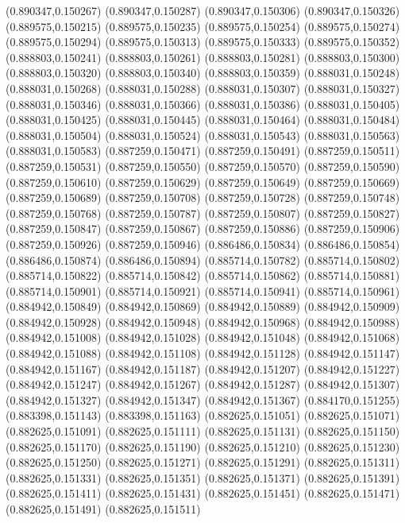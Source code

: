 (0.890347,0.150267)
(0.890347,0.150287)
(0.890347,0.150306)
(0.890347,0.150326)
(0.889575,0.150215)
(0.889575,0.150235)
(0.889575,0.150254)
(0.889575,0.150274)
(0.889575,0.150294)
(0.889575,0.150313)
(0.889575,0.150333)
(0.889575,0.150352)
(0.888803,0.150241)
(0.888803,0.150261)
(0.888803,0.150281)
(0.888803,0.150300)
(0.888803,0.150320)
(0.888803,0.150340)
(0.888803,0.150359)
(0.888031,0.150248)
(0.888031,0.150268)
(0.888031,0.150288)
(0.888031,0.150307)
(0.888031,0.150327)
(0.888031,0.150346)
(0.888031,0.150366)
(0.888031,0.150386)
(0.888031,0.150405)
(0.888031,0.150425)
(0.888031,0.150445)
(0.888031,0.150464)
(0.888031,0.150484)
(0.888031,0.150504)
(0.888031,0.150524)
(0.888031,0.150543)
(0.888031,0.150563)
(0.888031,0.150583)
(0.887259,0.150471)
(0.887259,0.150491)
(0.887259,0.150511)
(0.887259,0.150531)
(0.887259,0.150550)
(0.887259,0.150570)
(0.887259,0.150590)
(0.887259,0.150610)
(0.887259,0.150629)
(0.887259,0.150649)
(0.887259,0.150669)
(0.887259,0.150689)
(0.887259,0.150708)
(0.887259,0.150728)
(0.887259,0.150748)
(0.887259,0.150768)
(0.887259,0.150787)
(0.887259,0.150807)
(0.887259,0.150827)
(0.887259,0.150847)
(0.887259,0.150867)
(0.887259,0.150886)
(0.887259,0.150906)
(0.887259,0.150926)
(0.887259,0.150946)
(0.886486,0.150834)
(0.886486,0.150854)
(0.886486,0.150874)
(0.886486,0.150894)
(0.885714,0.150782)
(0.885714,0.150802)
(0.885714,0.150822)
(0.885714,0.150842)
(0.885714,0.150862)
(0.885714,0.150881)
(0.885714,0.150901)
(0.885714,0.150921)
(0.885714,0.150941)
(0.885714,0.150961)
(0.884942,0.150849)
(0.884942,0.150869)
(0.884942,0.150889)
(0.884942,0.150909)
(0.884942,0.150928)
(0.884942,0.150948)
(0.884942,0.150968)
(0.884942,0.150988)
(0.884942,0.151008)
(0.884942,0.151028)
(0.884942,0.151048)
(0.884942,0.151068)
(0.884942,0.151088)
(0.884942,0.151108)
(0.884942,0.151128)
(0.884942,0.151147)
(0.884942,0.151167)
(0.884942,0.151187)
(0.884942,0.151207)
(0.884942,0.151227)
(0.884942,0.151247)
(0.884942,0.151267)
(0.884942,0.151287)
(0.884942,0.151307)
(0.884942,0.151327)
(0.884942,0.151347)
(0.884942,0.151367)
(0.884170,0.151255)
(0.883398,0.151143)
(0.883398,0.151163)
(0.882625,0.151051)
(0.882625,0.151071)
(0.882625,0.151091)
(0.882625,0.151111)
(0.882625,0.151131)
(0.882625,0.151150)
(0.882625,0.151170)
(0.882625,0.151190)
(0.882625,0.151210)
(0.882625,0.151230)
(0.882625,0.151250)
(0.882625,0.151271)
(0.882625,0.151291)
(0.882625,0.151311)
(0.882625,0.151331)
(0.882625,0.151351)
(0.882625,0.151371)
(0.882625,0.151391)
(0.882625,0.151411)
(0.882625,0.151431)
(0.882625,0.151451)
(0.882625,0.151471)
(0.882625,0.151491)
(0.882625,0.151511)
